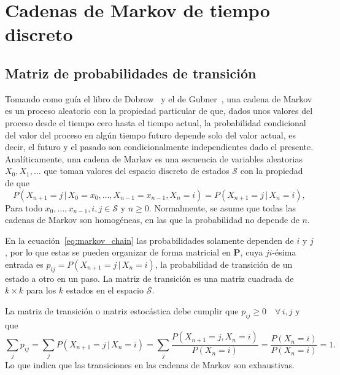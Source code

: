 \section*{Cadenas de Markov de tiempo discreto}

\subsection*{Matriz de probabilidades de transición}

Tomando como guía el libro de Dobrow~\citeyearpar{Dobrow2016} y el de Gubner~\citeyearpar{Gubner2006}, una cadena de
Markov es un proceso aleatorio con la propiedad particular de que, dados unos valores del proceso desde el tiempo cero
hasta el tiempo actual, la probabilidad condicional del valor del proceso en algún tiempo futuro depende solo del valor
actual, es decir, el futuro y el pasado son condicionalmente independientes dado el presente.
Analíticamente, una cadena de Markov es una secuencia de variables aleatorias $X_0, X_1, \dots$ que toman valores del
espacio discreto de estados $\mathcal{S}$ con la propiedad de que
%
\begin{equation}
    \label{eq:markov_chain}
    P\left(X_{n + 1} = j\,|\,X_0 = x_0, \dots, X_{n - 1}
    = x_{n - 1}, X_n = i\right) = P\left(X_{n + 1} = j\,|\,X_n = i\right),
\end{equation}
%
Para todo $x_0, \dots, x_{n - 1}, i, j \in \mathcal{S}$ y $n \ge 0$.
Normalmente, se asume que todas las cadenas de Markov son homogéneas, en las que la probabilidad no depende de $n$.

En la ecuación~\eqref{eq:markov_chain} las probabilidades solamente dependen de $i$ y $j$, por lo que estas se pueden
organizar de forma matricial en $\mathbf{P}$, cuya $ji$-ésima entrada es
$p_{ij} = P\left(X_{n + 1} = j\,|\,X_n = i\right)$, la probabilidad de transición de un estado a otro en un paso.
La matriz de transición es una matriz cuadrada de $k \times k$ para los $k$ estados en el espacio $\mathcal{S}$.

La matriz de transición o matriz estocástica debe cumplir que $p_{ij} \ge 0 \quad \forall\,i,j$ y que
%
\begin{equation*}
    \sum_j p_{ij} = \sum_j P\left(X_{n + 1} = j\,|\,X_n = i\right)
    = \sum_j \frac{P\left(X_{n + 1} = j, X_n = i\right)}{P\left(X_n = i\right)}
    = \frac{P\left(X_n = i\right)}{P\left(X_n = i\right)} = 1.
\end{equation*}
%
Lo que indica que las transiciones en las cadenas de Markov son exhaustivas.

